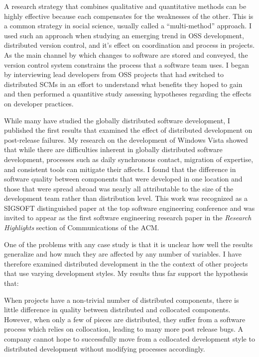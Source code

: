 \documentclass[10pt]{article}
\begin{document}
\begin{small}
A research strategy that combines qualitative and quantitative methods can be
highly effective because each compensates for the weaknesses of the other.
This is a common strategy in social science, usually called a ``multi-method''
approach.  I used such an approach when studying an emerging trend in
OSS development, distributed version control, and it's effect on coordination
and process in projects.  As the main channel by which changes to software are
stored and conveyed, the version control system constrains the process that a
software team uses.  I began by interviewing lead developers from OSS projects
that had switched to distributed SCMs in an effort to understand what benefits
they hoped to gain and then performed a quantitive study assessing hypotheses
regarding the effects on developer practices.

While many have studied the globally distributed software development, I
published the first results that examined the effect of distributed development
on post-release failures.  My research on the development of Windows Vista
showed that while there are difficulties inherent in globally distributed
software development, processes such as daily synchronous contact, migration of
expertise, and consistent tools can mitigate their affects.  I found that the
difference in software quality between components that were developed in one
location and those that were spread abroad was nearly all attributable to the
size of the development team rather than distribution level.  This work was
recognized as a SIGSOFT distinguished paper at the top software engineering
conference and was invited to appear as the first software engineering research
paper in the \emph{Research Highlights} section of Communications of the ACM.

One of the problems with any case study is that it is unclear how well the
results generalize and how much they are affected by any number of variables.
I have therefore examined distributed development in the the context of other
projects that use varying development styles.  My results thus far support
the hypothesis that:

When projects have a non-trivial number of distributed components, there is
little difference in quality between distributed and collocated components.
However, when only a few of pieces are distributed, they suffer from a software
process which relies on collocation, leading to many more post release bugs.  A
company cannot hope to successfully move from a collocated development style to
distributed development without modifying processes accordingly.


\end{small}
\end{document}

